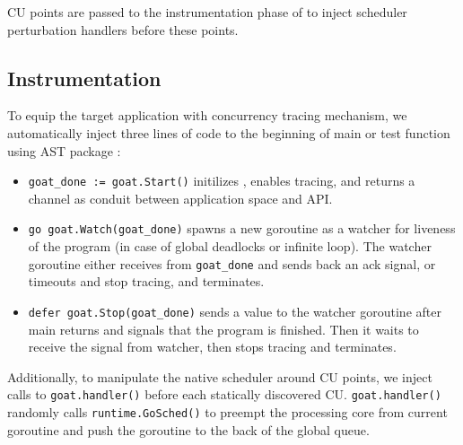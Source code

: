 CU points are passed to the instrumentation phase of \goat to inject scheduler perturbation handlers before these points.
%
%
%

\subsection{Instrumentation}
\label{sec:instrument}
To equip the target application with concurrency tracing mechanism, we automatically inject three lines of code to the beginning of main or test function using AST package \cite{go-package-ast}:

\begin{itemize}
  \item \texttt{goat\_done := goat.Start()} initilizes \goat, enables tracing, and returns a channel as conduit between application space and \goat API.
  \item \texttt{go goat.Watch(goat\_done)} spawns a new goroutine as a watcher for liveness of the program (in case of global deadlocks or infinite loop). The watcher goroutine either receives from \texttt{goat\_done} and sends back an ack signal, or timeouts and stop tracing, and terminates.
  \item \texttt{defer goat.Stop(goat\_done)} sends a value to the watcher goroutine after main returns and signals that the program is finished. Then it waits to receive the signal from watcher, then stops tracing and terminates.
\end{itemize}

Additionally, to manipulate the native scheduler around CU points, we inject calls to \texttt{goat.handler()} before each statically discovered CU. \texttt{goat.handler()} randomly calls \texttt{runtime.GoSched()} to preempt the processing core from current goroutine and push the goroutine to the back of the global queue.



